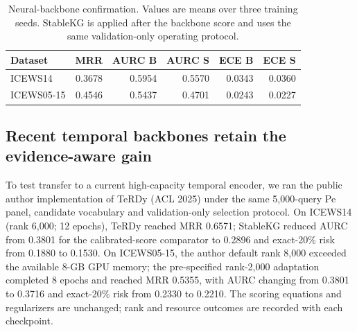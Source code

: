 \documentclass[preprint,12pt]{elsarticle}
\begin{document}
\begin{table}[!htbp]
\centering
\caption{Neural-backbone confirmation. Values are means over three training seeds. StableKG is applied after the backbone score and uses the same validation-only operating protocol.}
\label{tab:neural}
\small
\begin{tabular}{lrrrrr}
\toprule
Dataset & MRR & AURC B & AURC S & ECE B & ECE S\\
\midrule
ICEWS14 & 0.3678 & 0.5954 & 0.5570 & 0.0343 & 0.0360\\
ICEWS05-15 & 0.4546 & 0.5437 & 0.4701 & 0.0243 & 0.0227\\
\bottomrule
\end{tabular}
\end{table}

\subsection{Recent temporal backbones retain the evidence-aware gain}
To test transfer to a current high-capacity temporal encoder, we ran the public author implementation of TeRDy (ACL 2025) under the same 5,000-query Pe panel, candidate vocabulary and validation-only selection protocol. On ICEWS14 (rank 6,000; 12 epochs), TeRDy reached MRR 0.6571; StableKG reduced AURC from 0.3801 for the calibrated-score comparator to 0.2896 and exact-20\% risk from 0.1880 to 0.1530. On ICEWS05-15, the author default rank 8,000 exceeded the available 8-GB GPU memory; the pre-specified rank-2,000 adaptation completed 8 epochs and reached MRR 0.5355, with AURC changing from 0.3801 to 0.3716 and exact-20\% risk from 0.2330 to 0.2210. The scoring equations and regularizers are unchanged; rank and resource outcomes are recorded with each checkpoint.

\begin{table}[!htbp]
\centering
\caption{Recent author-code backbone comparison. B is the validation-selected calibrated-score comparator and S is StableKG.}
\label{tab:recent}
\small
{}
\end{table}
\end{document}
